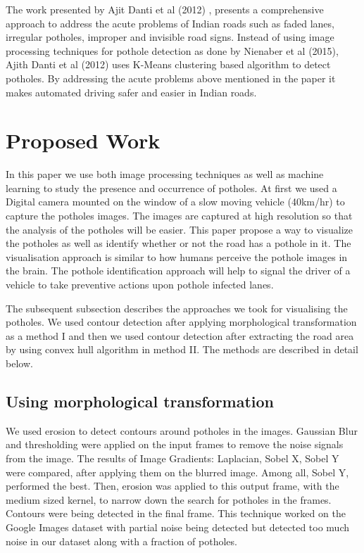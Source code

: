 \documentclass[journal]{IEEEtran}
\begin{document}
\vspace*{.5cm}

The work presented by Ajit Danti et al (2012) \cite{papertwo}, presents a comprehensive approach to address the acute problems of Indian roads such as faded lanes, irregular potholes, improper and invisible road signs. Instead of using image processing techniques for pothole detection as done by Nienaber et al (2015), Ajith Danti et al (2012) uses K-Means clustering based algorithm to detect potholes. By addressing the acute problems above mentioned in the paper it makes automated driving safer and easier in Indian roads. 

\section{Proposed Work}
In this paper we use both image processing techniques as well as machine learning to study the presence and occurrence of potholes. At first we used a Digital camera mounted on the window of a slow moving vehicle (40km/hr) to capture the potholes images. The images are captured at high resolution so that the analysis of the potholes will be easier. This paper propose a way to visualize the potholes as well as identify whether or not the road has a pothole in it. The visualisation approach is similar to how humans perceive the pothole images in the brain. The pothole identification approach will help to signal the driver of a vehicle to take preventive actions upon pothole infected lanes. 

The subsequent subsection describes the approaches we took for visualising the potholes. We used contour detection after applying morphological transformation as a method I and then we used contour detection after extracting the road area by using convex hull algorithm in method II. The methods are described in detail below.

\subsection{Using morphological transformation}

We used erosion to detect contours around potholes in the images. Gaussian Blur and thresholding were applied on the input frames to remove the noise signals from the image. The results of Image Gradients: Laplacian, Sobel X, Sobel Y were compared, after applying them on the blurred image. Among all, Sobel Y, performed the best. Then, erosion was applied to this output frame, with the medium sized kernel, to narrow down the search for potholes in the frames. Contours were being detected in the final frame. This technique worked on the Google Images dataset with partial noise being detected but detected too much noise in our dataset along with a fraction of potholes.
\end{document}
